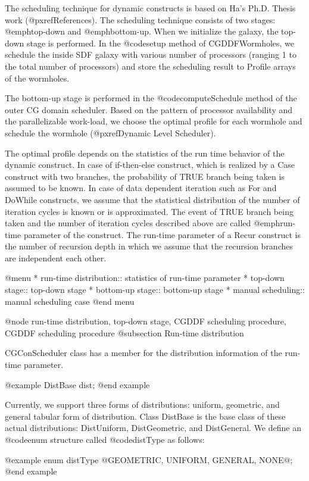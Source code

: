 {The scheduling technique for dynamic constructs is based on Ha's Ph.D.
Thesis work (@pxref{References}). The scheduling technique consists of
two stages: @emph{top-down} and @emph{bottom-up}. When we initialize 
the galaxy,
the top-down stage is performed. In the @code{setup} method of CGDDFWormholes,
we schedule the inside SDF galaxy with various number of processors
(ranging 1 to the total number of processors) and store the scheduling
result to Profile arrays of the wormholes. 

The bottom-up stage is performed in the @code{computeSchedule} method of
the outer CG domain scheduler. Based on the pattern of processor
availability and the parallelizable work-load, we choose the
optimal profile for each wormhole and schedule the wormhole
(@pxref{Dynamic Level Scheduler}). 

The optimal profile depends on
the statistics of the run time behavior of the dynamic construct.
In case of if-then-else construct, which is realized by a Case construct with
two branches, the probability of TRUE branch being taken is assumed to be
known. In case of data dependent iteration such as For and DoWhile constructs,
we assume that the statistical distribution of the number of
iteration cycles is known or is approximated. The event of TRUE branch
being taken and the number of iteration cycles described above are
called @emph{run-time parameter} of the construct. The run-time
parameter of a Recur construct is the number of recursion depth in which
we assume that the recursion branches are independent each other.

@menu
* run-time distribution::	statistics of run-time parameter
* top-down stage::		top-down stage
* bottom-up stage::		bottom-up stage
* manual scheduling::		manual scheduling case
@end menu

@node run-time distribution, top-down stage, CGDDF scheduling procedure, CGDDF scheduling procedure
@subsection Run-time distribution

CGConScheduler class has a member for the distribution information 
of the run-time parameter.

@example
DistBase dist;
@end example

Currently, we support three forms of distributions: uniform, geometric, and
general tabular form of distribution. Class DistBase is the base
class of these actual distributions: DistUniform, DistGeometric, and
DistGeneral. We define an @code{enum} structure called
@code{distType} as follows:

@example
enum distType @{GEOMETRIC, UNIFORM, GENERAL, NONE@};
@end example

}
